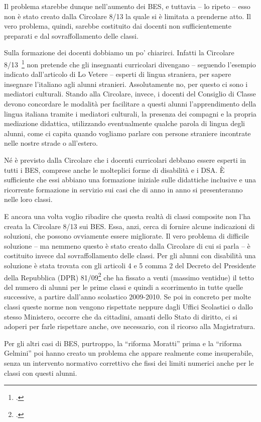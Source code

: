 Il problema starebbe dunque nell'aumento dei BES, e tuttavia – lo ripeto – esso non è stato creato dalla Circolare 8/13 la quale si è limitata a prenderne atto. Il vero problema, quindi, sarebbe costituito dai docenti non sufficientemente preparati e dal sovraffollamento delle classi.

Sulla formazione dei docenti dobbiamo un po' chiarirci. Infatti la Circolare 8/13~\footcite{cm8_2013} non pretende che gli insegnanti curricolari divengano – seguendo l'esempio indicato dall'articolo di Lo Vetere – esperti di lingua straniera, per sapere insegnare l'italiano agli alunni stranieri. Assolutamente no, per questo ci sono i mediatori culturali. Stando alla Circolare, invece, i docenti del Consiglio di Classe devono concordare le modalità per facilitare a questi alunni l'apprendimento della lingua italiana tramite i mediatori culturali, la presenza dei compagni e la propria mediazione didattica, utilizzando eventualmente qualche parola di lingua degli alunni, come ci capita quando vogliamo parlare con persone straniere incontrate nelle nostre strade o all'estero.

Né è previsto dalla Circolare che i docenti curricolari debbano essere esperti in tutti i BES, comprese anche le molteplici forme di disabilità e i DSA. È sufficiente che essi abbiano una formazione iniziale sulle didattiche inclusive e una ricorrente formazione in servizio sui casi che di anno in anno si presenteranno nelle loro classi.

E ancora una volta voglio ribadire che questa realtà di classi composite non l'ha creata la Circolare 8/13 sui BES. Essa, anzi, cerca di fornire alcune indicazioni di soluzioni, che possono ovviamente essere migliorate.
Il vero problema di difficile soluzione – ma nemmeno questo è stato creato dalla Circolare di cui si parla – è costituito invece dal sovraffollamento delle classi. Per gli alunni con disabilità una soluzione è stata trovata con gli articoli 4 e 5 comma 2 del Decreto del Presidente della Repubblica (DPR) 81/09\footcite{DPR_81_2009} che ha fissato a venti (massimo ventidue) il tetto del numero di alunni per le prime classi e quindi a scorrimento in tutte quelle successive, a partire dall'anno scolastico 2009-2010. Se poi in concreto per molte classi queste norme non vengono rispettate neppure dagli Uffici Scolastici o dallo stesso Ministero, occorre che da cittadini, amanti dello Stato di diritto, ci si adoperi per farle rispettare anche, ove necessario, con il ricorso alla Magistratura.

Per gli altri casi di BES, purtroppo, la “riforma Moratti” prima e la “riforma Gelmini” poi hanno creato un problema che appare realmente come insuperabile, senza un intervento normativo correttivo che fissi dei limiti numerici anche per le classi con questi alunni.

